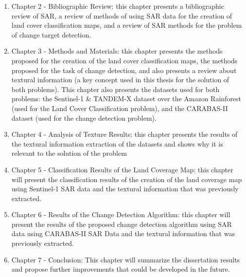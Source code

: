 \begin{enumerate}
    \item Chapter 2 - Bibliographic Review: this chapter presents a bibliographic review of SAR, a review of methods of using SAR data for the creation
          of land cover classification maps, and a review of SAR methods for the problem of change target detection.
    \item Chapter 3 - Methods and Materials: this chapter presents the methods proposed for the creation of the land cover classification maps, the methods proposed for the
          task of change detection, and also presents a review about textural information (a key concept used in this thesis for the solution of both problems). This chapter also presents
          the datasets used for both problems: the Sentinel-1 \& TANDEM-X dataset over the Amazon Rainforest (used for the Land Cover Classification problem), and the CARABAS-II dataset (used for the change detection problem).
    \item Chapter 4 - Analysis of Texture Results: this chapter presents the results of the textural information extraction of the datasets and shows why it is relevant to the solution of the problem
    \item Chapter 5 - Classification Results of the Land Coverage Map: this chapter will present the classification results of the creation of the land coverage map using Sentinel-1 SAR data and the textural information that was previously extracted.
    \item Chapter 6 - Results of the Change Detection Algorithm: this chapter will present the results of the proposed change detection algorithm using SAR data using CARABAS-II SAR Data and the textural information that was previously extracted.
    \item Chapter 7 - Conclusion: This chapter will summarize the dissertation results and propose further improvements that could be developed in the future.
\end{enumerate}

